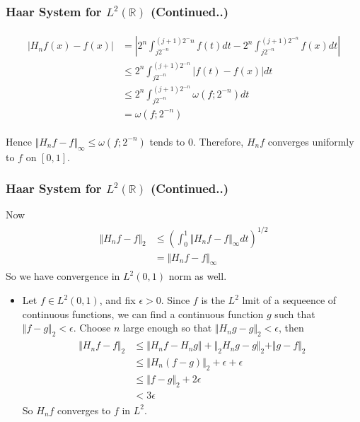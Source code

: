 \documentclass{beamer}
\begin{document}
\begin{frame}
    \frametitle{ Haar System for  $L^2\left({\mathbb{R}}\right)$ (Continued..)}
    \begin{eqnarray*}
        \begin{split}
            |H_nf(x) - f(x)| &= |2^n\int_{j2^{-n}}^{(j+1)2^-n}f(t)dt-2^n\int_{j2^{-n}}^{(j+1)2^{-n}}f(x)dt| \\
            &\le 2^n \int_{j2^{-n}}^{(j+1)2^{-n}}|f(t) - f(x)|dt \\
            &\le 2^n \int_{j2^{-n}}^{(j+1)2^{-n}}\omega(f;2^{-n})dt \\
            &= \omega(f;2^{-n})
        \end{split}
    \end{eqnarray*}

    Hence $\Vert H_nf - f \Vert_{\infty} \le \omega(f;2^{-n})$ tends to 0. Therefore, $H_nf$ converges uniformly to $f$ on $[0, 1]$.
\end{frame}


\begin{frame}
    \frametitle{Haar System for  $L^2\left({\mathbb{R}}\right)$ (Continued..)}
    Now
    \begin{eqnarray*}
        \begin{split}
            \Vert H_nf - f \Vert_{2} &\le \left(\int_0^1 \Vert H_nf - f \Vert_{\infty}dt \right)^{1/2}\\
            &= \Vert H_nf - f \Vert_{\infty}
        \end{split}
    \end{eqnarray*}
So we have convergence in $L^2(0,1)$ norm as well.
\begin{itemize}
    \item Let  $f \in L^2(0,1)$, and fix $ \epsilon > 0$. Since $f$ is the $L^2$ lmit of a sequeence of 
    continuous functions, we can find a continuous function $g$ such that $\Vert f - g \Vert_2 < \epsilon$. Choose $n$ large enough so that
    $\Vert H_ng - g \Vert_2 < \epsilon$, then
    \begin{eqnarray*}
        \begin{split}
            \Vert H_nf - f \Vert_{2} &\le \Vert H_nf - H_ng \Vert + \Vert_2 H_ng- g \Vert_2  + \Vert g -f \Vert_2 \\
            &\le \Vert H_n(f- g)\Vert_2 + \epsilon + \epsilon \\
            &\le \Vert f- g\Vert_2 +  2\epsilon \\
            &< 3\epsilon
        \end{split}
    \end{eqnarray*}
    So $H_nf$ converges to $f$  in $L^2$.
\end{itemize}
\end{frame}
    
\end{document}
